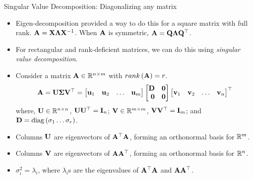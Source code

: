 \documentclass[aspectratio=169]{beamer}
\def\mf{\ensuremath\mathbf}
\def\mb{\ensuremath\mathbb}
\def\lp{\ensuremath\left(}
\def\rp{\ensuremath\right)}
\def\bmx{\ensuremath\begin{bmatrix*}[r]}
\def\emx{\ensuremath\end{bmatrix*}}
\begin{document}
\begin{frame}[t]{Singular Value Decomposition: Diagonalizing any matrix}
\begin{itemize}
    \item Eigen-decomposition provided a way to do this for a square matrix with full rank. $\mf{A} = \mf{X}\mf{\Lambda}\mf{X}^{-1}$. When $\mf{A}$ is symmetric, $\mf{A} = \mf{Q}\mf{\Lambda}\mf{Q}^\top$.

    \item For rectangular and rank-deficient matrices, we can do this using \textit{singular value decomposition}.

    \item Consider a matrix $\mf{A} \in \mb{R}^{n \times m}$ with $rank\lp\mf{A}\rp = r$.
    \[ \mf{A} = \mf{U}\mf{\Sigma}\mf{V}^\top = \bmx \mf{u}_1 & \mf{u}_2 & \ldots & \mf{u}_m\emx
    \bmx \mf{D} & \mf{0}\\
    \mf{0} & \mf{0} \emx \bmx \mf{v}_1 & \mf{v}_2 & \ldots & \mf{v}_n \emx^\top\]
    where, $\mf{U} \in \mb{R}^{n \times n}$, $\mf{U}\mf{U}^\top = \mf{I}_n$; $\mf{V}\in \mb{R}^{m \times m}$, $\mf{V}\mf{V}^\top = \mf{I}_m$; and $\mf{D} = \mathrm{diag}\lp\sigma_1 \ldots \sigma_r\rp$.

    \item Columns $\mf{U}$ are eigenvectors of $\mf{A}^\top\mf{A}$, forming an orthonormal basis for $\mb{R}^m$.

    \item Columns $\mf{V}$ are eigenvectors of $\mf{A}\mf{A}^\top$, forming an orthonormal basis for $\mb{R}^n$.

    \item $\sigma_i^2 = \lambda_i$, where $\lambda_i$s are the eigenvalues of $\mf{A}^\top\mf{A}$ and $\mf{A}\mf{A}^\top$.
\end{itemize}
\end{frame}
\end{document}
